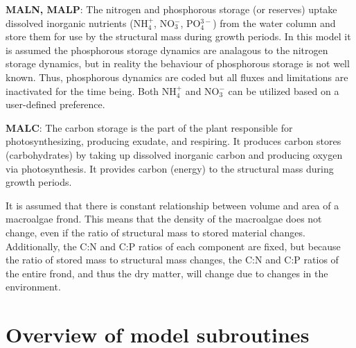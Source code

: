 \documentclass{deltares_manual}
\begin{document}
\textbf{MALN, MALP}: The nitrogen and phosphorous storage (or reserves) uptake dissolved inorganic nutrients (NH$_{4}^{+}$, NO$_{3}^{-}$, PO$_{4}^{3-}$) from the water column and store them for use by the structural mass during growth periods. In this model it is assumed the phosphorous storage dynamics are analagous to the nitrogen storage dynamics, but in reality the behaviour of phosphorous storage is not well known. Thus, phosphorous dynamics are coded but all fluxes and limitations are inactivated for the time being. Both NH$_{4}^{+}$ and NO$_{3}^{-}$ can be utilized based on a user-defined preference.

\textbf{MALC}: The carbon storage is the part of the plant responsible for photosynthesizing, producing exudate, and respiring. It produces carbon stores (carbohydrates) by taking up dissolved inorganic carbon and producing oxygen via photosynthesis. It provides carbon (energy) to the structural mass during growth periods. 

It is assumed that there is constant relationship between volume and area of a macroalgae frond. This means that the density of the macroalgae does not change, even if the ratio of structural mass to stored material changes. Additionally, the C:N and C:P ratios of each component are fixed, but because the ratio of stored mass to structural mass changes, the C:N and C:P ratios of the entire frond, and thus the dry matter, will change due to changes in the environment.
\pagebreak

\chapter{Overview of model subroutines}
\end{document}
